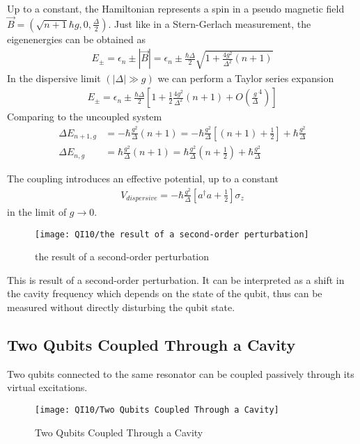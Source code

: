 Up to a constant, the Hamiltonian represents a spin in a pseudo magnetic field $\vec{B}=\left( \sqrt{n+1}\hbar g, 0, \frac{\Delta}{2} \right)$. Just like in a Stern-Gerlach measurement, the eigenenergies can be obtained as
\begin{align*}
    E_\pm =\epsilon_n\pm |\vec{B}|=\epsilon_n\pm \frac{\hbar\Delta}{2}\sqrt{1+\frac{4g^2}{\Delta^2}(n+1)}
\end{align*}
In the dispersive limit $(|\Delta|\gg g)$ we can perform a Taylor series expansion
\begin{align*}
    E_\pm=\epsilon_n\pm \frac{\hbar \Delta}{2}\left[ 1+\frac{1}{2}\frac{4g^2}{\Delta^2}(n+1)+O\left(  \frac{g}{\Delta}^4 \right) \right]
\end{align*}
Comparing to the uncoupled system
\begin{align*}
    \Delta E_{n+1, g}&=-\hbar\frac{g^2}{\Delta}(n+1)=-\hbar\frac{g^2}{\Delta}\left[ (n+1)+\frac{1}{2} \right]+\hbar \frac{g^2}{\Delta}\\
    \Delta E_{n, g}&=\hbar\frac{g^2}{\Delta}(n+1)=\hbar\frac{g^2}{\Delta}\left( n+\frac{1}{2} \right)+\hbar \frac{g^2}{\Delta}
\end{align*}

The coupling introduces an effective potential, up to a constant
\begin{align*}
    V_{dispersive}=-\hbar \frac{g^2}{\Delta}\left[ a^\dagger a+\frac{1}{2} \right]\sigma_z
\end{align*}
in the limit of $g\rightarrow 0$. 

\begin{figure}[!htb]
    \centering
    \texttt{[image: QI10/the result of a second-order perturbation]}
    \caption{the result of a second-order perturbation}
\end{figure}

This is result of a second-order perturbation. It can be interpreted as a shift in the cavity frequency which depends on the state of the qubit, thus can be measured without directly disturbing the qubit state. 

\subsection{Two Qubits Coupled Through a Cavity}
Two qubits connected to the same resonator can be coupled passively through its virtual excitations.

\begin{figure}[!htb]
    \centering
    \texttt{[image: QI10/Two Qubits Coupled Through a Cavity]}
    \caption{Two Qubits Coupled Through a Cavity}
\end{figure}

